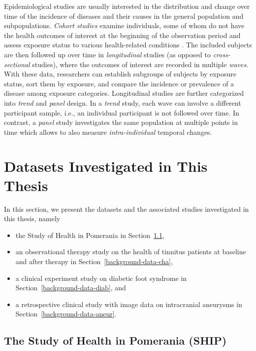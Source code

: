\documentclass[
  oneside]{book}
\providecommand{\tightlist}{%
  \setlength{\itemsep}{0pt}\setlength{\parskip}{0pt}}
\begin{document}
Epidemiological studies are usually interested in the distribution and change over time of the incidence of diseases and their causes in the general population and subpopulations.
\emph{Cohort studies} examine individuals, some of whom do not have the health outcomes of interest at the beginning of the observation period and assess exposure status to various health-related conditions \autocite{glenn2005cohort}.
The included subjects are then followed up over time in \emph{longitudinal} studies (as opposed to \emph{cross-sectional} studies), where the outcomes of interest are recorded in multiple \emph{waves}.
With these data, researchers can establish subgroups of subjects by exposure status, sort them by exposure, and compare the incidence or prevalence of a disease among exposure categories.
Longitudinal studies are further categorized into \emph{trend} and \emph{panel} design.
In a \emph{trend} study, each wave can involve a different participant sample, i.e., an individual participant is not followed over time.
In contrast, a \emph{panel} study investigates the same population at multiple points in time which allows to also measure \emph{intra-individual} temporal changes.

\hypertarget{background-data}{%
\section{Datasets Investigated in This Thesis}\label{background-data}}

In this section, we present the datasets and the associated studies investigated in this thesis, namely

\begin{itemize}
\tightlist
\item
  the Study of Health in Pomerania in Section~\ref{background-data-ship},
\item
  an observational therapy study on the health of tinnitus patients at baseline and after therapy in Section~\ref{background-data-cha},
\item
  a clinical experiment study on diabetic foot syndrome in Section~\ref{background-data-diab}, and
\item
  a retrospective clinical study with image data on intracranial aneurysms in Section~\ref{background-data-aneur}.
\end{itemize}

\hypertarget{background-data-ship}{%
\subsection{The Study of Health in Pomerania (SHIP)}\label{background-data-ship}}
\end{document}
